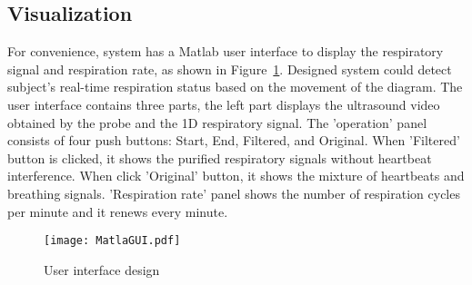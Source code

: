\subsection{Visualization}
For convenience, system has a Matlab user interface to display the respiratory signal and respiration rate, as shown in Figure~\ref{fig.GUI}. Designed system could detect subject's real-time respiration status based on the movement of the diagram. The user interface contains three parts, the left part displays the ultrasound video obtained by the probe and the 1D respiratory signal. The 'operation' panel consists of four push buttons: Start, End, Filtered, and Original. When 'Filtered' button is clicked, it shows the purified respiratory signals without heartbeat interference. When click 'Original' button, it shows the mixture of heartbeats and breathing signals. 'Respiration rate' panel shows the number of respiration cycles per minute and it renews every minute.

\begin{figure}[h!]
\centering
\texttt{[image: MatlaGUI.pdf]}
\caption{User interface design}
\label{fig.GUI}
\end{figure}
